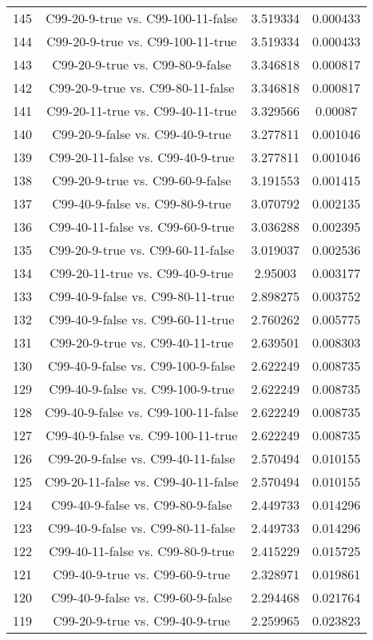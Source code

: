 \documentclass[a4paper,10pt]{article}
\begin{document}
\begin{landscape}
\begin{table}[!htp]
\begin{tabular}{cccc}
145&C99-20-9-true vs. C99-100-11-false&3.519334&0.000433\\
144&C99-20-9-true vs. C99-100-11-true&3.519334&0.000433\\
143&C99-20-9-true vs. C99-80-9-false&3.346818&0.000817\\
142&C99-20-9-true vs. C99-80-11-false&3.346818&0.000817\\
141&C99-20-11-true vs. C99-40-11-true&3.329566&0.00087\\
140&C99-20-9-false vs. C99-40-9-true&3.277811&0.001046\\
139&C99-20-11-false vs. C99-40-9-true&3.277811&0.001046\\
138&C99-20-9-true vs. C99-60-9-false&3.191553&0.001415\\
137&C99-40-9-false vs. C99-80-9-true&3.070792&0.002135\\
136&C99-40-11-false vs. C99-60-9-true&3.036288&0.002395\\
135&C99-20-9-true vs. C99-60-11-false&3.019037&0.002536\\
134&C99-20-11-true vs. C99-40-9-true&2.95003&0.003177\\
133&C99-40-9-false vs. C99-80-11-true&2.898275&0.003752\\
132&C99-40-9-false vs. C99-60-11-true&2.760262&0.005775\\
131&C99-20-9-true vs. C99-40-11-true&2.639501&0.008303\\
130&C99-40-9-false vs. C99-100-9-false&2.622249&0.008735\\
129&C99-40-9-false vs. C99-100-9-true&2.622249&0.008735\\
128&C99-40-9-false vs. C99-100-11-false&2.622249&0.008735\\
127&C99-40-9-false vs. C99-100-11-true&2.622249&0.008735\\
126&C99-20-9-false vs. C99-40-11-false&2.570494&0.010155\\
125&C99-20-11-false vs. C99-40-11-false&2.570494&0.010155\\
124&C99-40-9-false vs. C99-80-9-false&2.449733&0.014296\\
123&C99-40-9-false vs. C99-80-11-false&2.449733&0.014296\\
122&C99-40-11-false vs. C99-80-9-true&2.415229&0.015725\\
121&C99-40-9-true vs. C99-60-9-true&2.328971&0.019861\\
120&C99-40-9-false vs. C99-60-9-false&2.294468&0.021764\\
119&C99-20-9-true vs. C99-40-9-true&2.259965&0.023823\\

\end{tabular}
\end{table}
\end{landscape}
\end{document}
